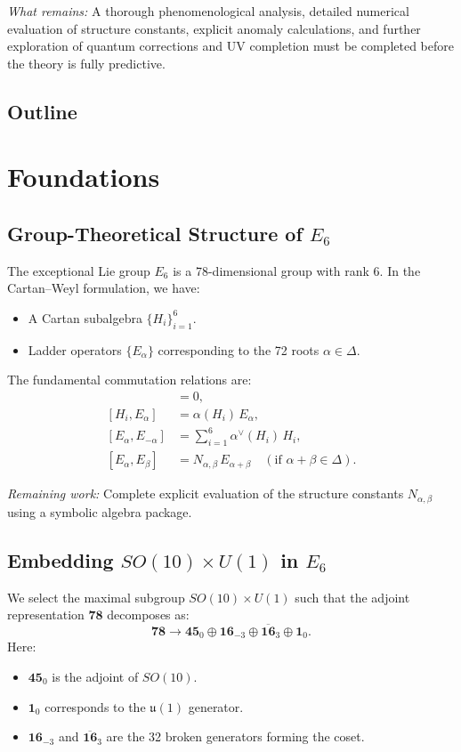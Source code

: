 \documentclass[aps,prd,preprint,groupedaddress]{revtex4-2}
\begin{document}
\emph{What remains:} A thorough phenomenological analysis, detailed numerical evaluation of structure constants, explicit anomaly calculations, and further exploration of quantum corrections and UV completion must be completed before the theory is fully predictive.

\subsection{Outline}

\section{Foundations}

\subsection{Group-Theoretical Structure of $E_6$}
The exceptional Lie group $E_6$ is a 78-dimensional group with rank 6. In the Cartan--Weyl formulation, we have:
\begin{itemize}
  \item A Cartan subalgebra $\{H_i\}_{i=1}^6$.
  \item Ladder operators $\{E_\alpha\}$ corresponding to the 72 roots $\alpha \in \Delta$.
\end{itemize}
The fundamental commutation relations are:
\begin{align}
[H_i, H_j] &= 0, \\
[H_i, E_\alpha] &= \alpha(H_i)\,E_\alpha, \\
[E_\alpha, E_{-\alpha}] &= \sum_{i=1}^6 \alpha^\vee(H_i)\,H_i, \\
[E_\alpha, E_\beta] &= N_{\alpha,\beta}\,E_{\alpha+\beta} \quad (\text{if } \alpha+\beta \in \Delta).
\end{align}

\emph{Remaining work:} Complete explicit evaluation of the structure constants $N_{\alpha,\beta}$ using a symbolic algebra package.

\subsection{Embedding $SO(10)\times U(1)$ in $E_6$}
We select the maximal subgroup $SO(10)\times U(1)$ such that the adjoint representation $\mathbf{78}$ decomposes as:
\[
\mathbf{78} \rightarrow \mathbf{45}_0 \oplus \mathbf{16}_{-3} \oplus \overline{\mathbf{16}}_{3} \oplus \mathbf{1}_0.
\]
Here:
\begin{itemize}
  \item $\mathbf{45}_0$ is the adjoint of $SO(10)$.
  \item $\mathbf{1}_0$ corresponds to the $\mathfrak{u}(1)$ generator.
  \item $\mathbf{16}_{-3}$ and $\overline{\mathbf{16}}_{3}$ are the 32 broken generators forming the coset.
\end{itemize}
\end{document}
